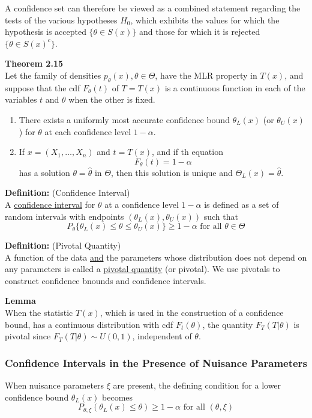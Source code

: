 \documentclass[12pt]{article}
\numberwithin{equation}{section}
\begin{document}
A confidence set can therefore be viewed as a combined statement regarding the tests of the various hypotheses $H_0$, which exhibits the values for which the hypothesis is accepted $\{\theta \in S(x) \}$ and those for which it is rejected $\{ \theta \in S(x)^c \}$.

\textbf{Theorem 2.15} \\
Let the family of densities $p_{\theta}(x), \theta \in \Theta$, have the MLR property in $T(x)$, and suppose that the cdf $F_{\theta}(t)$ of $T = T(x)$ is a continuous function in each of the variables $t$ and $\theta$ when the other is fixed.
\begin{enumerate}[(i.)]
  \item There exists a uniformly most accurate confidence bound $\theta_L(x)$ (or $\theta_U(x)$) for $\theta$ at each confidence level $1 - \alpha$.
  \item If $x = (X_1, \ldots, X_n)$ and $t = T(x)$, and if th equation
  \begin{equation*}
    F_{\theta}(t) = 1 - \alpha
  \end{equation*}
  has a solution $\theta = \hat{\theta}$ in $\Theta$, then this solution is unique and $\Theta_L(x) = \hat{\theta}$. 
\end{enumerate}

\textbf{Definition:} (Confidence Interval) \\
A \underline{confidence interval} for $\theta$ at a confidence level $1 - \alpha$ is defined as a set of random intervals with endpoints $(\theta_L(x), \theta_U(x))$ such that
\begin{equation*}
  P_{\theta}\{\theta_L(x) \le \theta \le \theta_U(x) \} \ge 1 - \alpha \text{ for all } \theta \in \Theta
\end{equation*}

\textbf{Definition:} (Pivotal Quantity) \\
A function of the data \underline{and} the parameters whose distribution does not depend on any parameters is called a \underline{pivotal quantity} (or pivotal). We use pivotals to construct confidence bnounds and confidence intervals. 

\textbf{Lemma} \\
When the statistic $T(x)$, which is used in the construction of a confidence bound, has a continuous distribution with cdf $F_t(\theta)$, the quantity $F_T(T | \theta)$ is pivotal since $F_T(T | \theta) \sim U(0, 1)$, independent of $\theta$. 

\subsubsection{Confidence Intervals in the Presence of Nuisance Parameters}
When nuisance parameters $\xi$ are present, the defining condition for a lower confidence bound $\theta_L(x)$ becomes
\begin{equation*}
  P_{\theta, \xi}(\theta_L(x) \le \theta) \ge 1 - \alpha \text{ for all } (\theta, \xi)
\end{equation*}
\end{document}
